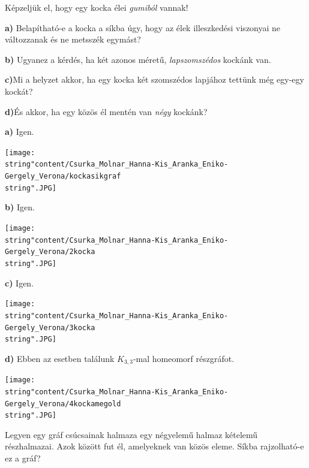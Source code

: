 \begin{extraproblem}
	Képzeljük el, hogy egy kocka élei \emph{gumiból} vannak!
	
	\textbf{a)} Belapítható-e a kocka a síkba úgy, hogy az élek illeszkedési
	viszonyai ne változzanak és ne metsszék egymást?
	
	\textbf{b)} Ugyanez a kérdés, ha két azonos méretű, \emph{lapszomszédos}
	kockánk van.
	
	\textbf{c)}Mi a helyzet akkor, ha egy kocka két szomszédos lapjához
	tettünk még egy-egy kockát?
	
	\textbf{d)}És akkor, ha egy közös él mentén van \emph{négy} kockánk?
\end{extraproblem}

\begin{solution}
	\textbf{a)} Igen.
	\begin{center}
		\texttt{[image: \\string"content/Csurka\_Molnar\_Hanna-Kis\_Aranka\_Eniko-Gergely\_Verona/kockasikgraf\\string".JPG]}
	\end{center}
	
	\textbf{b)} Igen.
	\begin{center}
		\texttt{[image: \\string"content/Csurka\_Molnar\_Hanna-Kis\_Aranka\_Eniko-Gergely\_Verona/2kocka\\string".JPG]}
	\end{center}
	
	\textbf{c)} Igen.
	\begin{center}
		\texttt{[image: \\string"content/Csurka\_Molnar\_Hanna-Kis\_Aranka\_Eniko-Gergely\_Verona/3kocka\\string".JPG]}
	\end{center}
	
	\textbf{d)} Ebben az esetben találunk $K_{3,3}$-mal homeomorf részgráfot.
	\begin{center}
		\texttt{[image: \\string"content/Csurka\_Molnar\_Hanna-Kis\_Aranka\_Eniko-Gergely\_Verona/4kockamegold\\string".JPG]}
	\end{center}
\end{solution}
\begin{extraproblem}
	Legyen egy gráf csúcsainak halmaza egy négyelemű halmaz kételemű
	részhalmazai. Azok között fut él, amelyeknek van közös eleme. Síkba
	rajzolható-e ez a gráf? 
\end{extraproblem}


